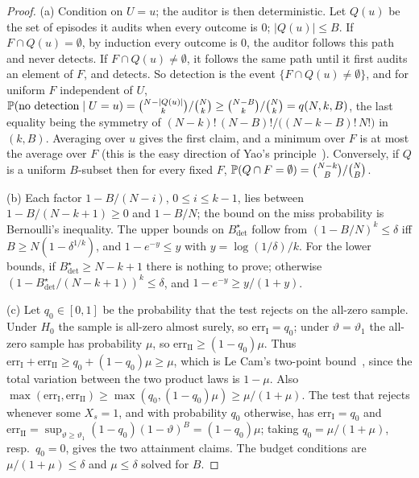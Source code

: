 \begin{proof}
(a) Condition on $U=u$; the auditor is then deterministic. Let $Q(u)$ be the
set of episodes it audits when every outcome is $0$; $|Q(u)|\le B$. If
$F\cap Q(u)=\emptyset$, by induction every outcome is $0$, the auditor follows
this path and never detects. If $F\cap Q(u)\ne\emptyset$, it follows the same
path until it first audits an element of $F$, and detects. So detection is the
event $\{F\cap Q(u)\neq\emptyset\}$, and for uniform $F$ independent of $U$,
$\mathbb{P}(\text{no detection}\mid U=u)=\binom{N-|Q(u)|}{k}/\binom Nk\ge
\binom{N-B}{k}/\binom Nk=q(N,k,B)$, the last equality being the symmetry of
$(N-k)!\,(N-B)!/\bigl((N-k-B)!\,N!\bigr)$ in $(k,B)$. Averaging over $u$ gives the first
claim, and a minimum over $F$ is at most the average over $F$ (this is the easy
direction of Yao's principle~\cite{yao1977probabilistic}). Conversely, if $Q$ is
a uniform $B$-subset then for every fixed $F$,
$\mathbb{P}(Q\cap F=\emptyset)=\binom{N-k}{B}/\binom NB$.

(b) Each factor $1-B/(N-i)$, $0\le i\le k-1$, lies between $1-B/(N-k+1)\ge0$
and $1-B/N$; the bound on the miss probability is Bernoulli's inequality. The
upper bounds on $B^\star_{\mathrm{det}}$ follow from $(1-B/N)^k\le\delta$ iff
$B\ge N(1-\delta^{1/k})$, and $1-e^{-y}\le y$ with $y=\log(1/\delta)/k$. For the
lower bounds, if $B^\star_{\mathrm{det}}\ge N-k+1$ there is nothing to prove;
otherwise $(1-B^\star_{\mathrm{det}}/(N-k+1))^k\le\delta$, and
$1-e^{-y}\ge y/(1+y)$.

(c) Let $q_0\in[0,1]$ be the probability that the test rejects on the all-zero
sample. Under $H_0$ the sample is all-zero almost surely, so $\mathrm{err}_{\mathrm I}=q_0$; under
$\vartheta=\vartheta_1$ the all-zero sample has probability $\mu$, so
$\mathrm{err}_{\mathrm{II}}\ge(1-q_0)\mu$. Thus $\mathrm{err}_{\mathrm I}+\mathrm{err}_{\mathrm{II}}\ge q_0+(1-q_0)\mu\ge\mu$, which is Le
Cam's two-point bound~\cite{lecam1973convergence,yu1997assouad}, since the total
variation between the two product laws is $1-\mu$. Also
$\max(\mathrm{err}_{\mathrm I},\mathrm{err}_{\mathrm{II}})\ge\max(q_0,(1-q_0)\mu)\ge\mu/(1+\mu)$. The test that rejects
whenever some $X_s=1$, and with probability $q_0$ otherwise, has $\mathrm{err}_{\mathrm I}=q_0$
and $\mathrm{err}_{\mathrm{II}}=\sup_{\vartheta\ge\vartheta_1}(1-q_0)(1-\vartheta)^B=(1-q_0)\mu$;
taking $q_0=\mu/(1+\mu)$, resp.\ $q_0=0$, gives the two attainment claims. The
budget conditions are $\mu/(1+\mu)\le\delta$ and $\mu\le\delta$ solved for $B$.
\end{proof}

